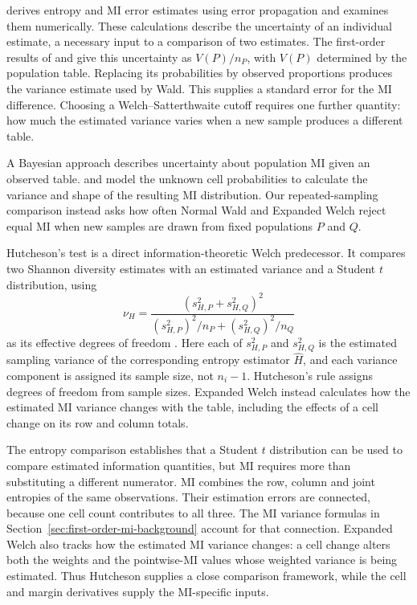 \medskip
{}

\citet{roulston1999} derives entropy and MI error estimates
using error propagation and examines them numerically. These calculations
describe the uncertainty of an individual estimate, a necessary input to a
comparison of two estimates.
The first-order results of \citet{moddemeijer1989} and
\citet{brillinger2004} give this uncertainty as \(V(P)/n_P\), with
\(V(P)\) determined by the population table. Replacing its probabilities
by observed proportions produces the variance estimate used by Wald.
This supplies a standard error for the MI difference. Choosing a
Welch--Satterthwaite cutoff requires one further quantity: how much the
estimated variance varies when a new sample produces a different table.

A Bayesian approach describes uncertainty about population MI given an
observed table. \citet{hutter2002} and \citet{hutterzaffalon2005} model the
unknown cell probabilities to calculate the variance and shape of the
resulting MI distribution. Our repeated-sampling comparison instead asks
how often Normal Wald and Expanded Welch reject equal MI when new samples
are drawn from fixed populations \(P\) and \(Q\).

Hutcheson's test is a direct information-theoretic Welch predecessor. It
compares two Shannon diversity estimates with an estimated variance and a
Student \(t\) distribution, using
\begin{equation}
  \nu_H=
  \frac{(s_{H,P}^2+s_{H,Q}^2)^2}
       {(s_{H,P}^2)^2/n_P+(s_{H,Q}^2)^2/n_Q}
  \label{eq:hutcheson-df}
\end{equation}
as its effective degrees of freedom \citep{hutcheson1970}. Here each of
\(s_{H,P}^2\) and \(s_{H,Q}^2\) is the estimated sampling variance of the
corresponding entropy estimator \(\widehat H\), and each variance component
is assigned its sample size, not \(n_i-1\).
Hutcheson's rule assigns degrees of freedom from sample sizes. Expanded
Welch instead calculates how the estimated MI variance changes with the
table, including the effects of a cell change on its row and column totals.

The entropy comparison establishes that a Student \(t\) distribution can
be used to compare estimated information quantities, but MI requires
more than substituting a different numerator. MI combines the row,
column and joint entropies of the same observations. Their estimation
errors are connected, because one cell count contributes to all three.
The MI variance formulas in Section~\ref{sec:first-order-mi-background}
account for that connection. Expanded Welch also tracks how the estimated
MI variance changes: a cell change alters
both the weights and the pointwise-MI values whose weighted variance is
being estimated. Thus Hutcheson supplies a close comparison framework,
while the cell and margin derivatives supply the MI-specific inputs.

